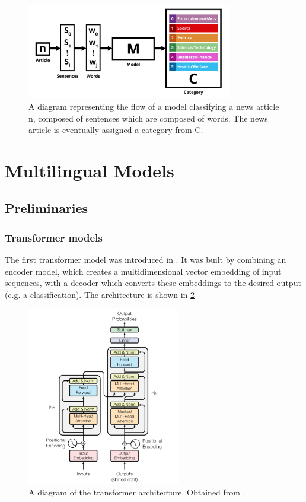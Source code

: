 \documentclass{l4proj}
\begin{document}
 \begin{figure}[h]
\centering
\includegraphics[width=0.8\textwidth]{images/Task Definition.png}
\caption{A diagram representing the flow of a model classifying a news article n, composed of sentences which are composed of words. The news article is eventually assigned a category from C.}
\label{fig:task-definition}
\end{figure}


\section{Multilingual Models}
\subsection{Preliminaries}
\label{section:preliminaries}
\subsubsection{Transformer models} \hfill \par
The first transformer model was introduced in \cite{vaswani2017attention}. It was built by combining an encoder model, which creates a multidimensional vector embedding of input sequences, with a decoder which converts these embeddings to the desired output (e.g. a classification). The architecture is shown in \ref{fig:transformer-architecture}

 \begin{figure}[h]
\centering
\includegraphics[width=0.6\textwidth]{images/transformer-architecture.png}
\caption{A diagram of the transformer architecture. Obtained from \cite{vaswani2017attention}.}
\label{fig:transformer-architecture}
\end{figure}
\end{document}
